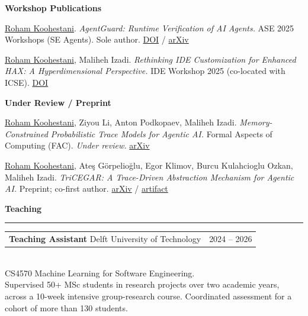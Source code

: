 \documentclass[11pt,letterpaper]{article}
\makeatletter
\newcommand{\cvsection}[1]{%
  \vspace{14pt}%
  {\large\textbf{#1}}\\[-5pt]%
  \rule{\linewidth}{0.4pt}%
  \vspace{4pt}%
}
\newcommand{\cvrow}[2]{%
  \begin{tabular*}{\linewidth}{@{}l@{\extracolsep{\fill}}r@{}}
    #1 & #2
  \end{tabular*}%
}
\newenvironment{publist}[1][0]{%
  \begin{list}{}{%
    \setlength{\leftmargin}{2.4em}%
    \setlength{\itemsep}{6pt}%
    \setlength{\parsep}{0pt}%
    \setlength{\topsep}{4pt}%
  }%
}{\end{list}}
\makeatother
\begin{document}
\vspace{6pt}
\textbf{Workshop Publications}

\begin{publist}
\item[{[W2]}]
  \underline{Roham Koohestani}.
  \textit{AgentGuard: Runtime Verification of AI Agents.}
  ASE 2025 Workshops (SE Agents). Sole author.
  \href{https://doi.org/10.1109/ASEW67777.2025.00023}{DOI} /
  \href{https://arxiv.org/abs/2509.23864}{arXiv}

\item[{[W1]}]
  \underline{Roham Koohestani}, Maliheh Izadi.
  \textit{Rethinking IDE Customization for Enhanced HAX: A Hyperdimensional Perspective.}
  IDE Workshop 2025 (co-located with ICSE).
  \href{https://doi.org/10.1109/IDE66625.2025.00007}{DOI}
\end{publist}

\vspace{6pt}
\textbf{Under Review / Preprint}

\begin{publist}
  \item[{[A2]}]
  \underline{Roham Koohestani}, Ziyou Li, Anton Podkopaev, Maliheh Izadi.
  \textit{Memory-Constrained Probabilistic Trace Models for Agentic AI.}
  Formal Aspects of Computing (FAC). \textit{Under review.}
  \href{https://arxiv.org/abs/2510.23487}{arXiv}

  \item[{[A1]}]
  \underline{Roham Koohestani}, Ate\c{s} G\"{o}rpelio\u{g}lu, Egor Klimov,
  Burcu Kulahcioglu Ozkan, Maliheh Izadi.
  \textit{TriCEGAR: A Trace-Driven Abstraction Mechanism for Agentic AI.}
  Preprint; co-first author.
  \href{https://arxiv.org/abs/2601.22997}{arXiv} /
  \href{https://zenodo.org/records/18338703}{artifact}
\end{publist}

\cvsection{Teaching}

\cvrow{%
  \textbf{Teaching Assistant} \hspace{4pt} Delft University of Technology%
}{2024 -- 2026}\\[2pt]
\hspace*{12pt}
CS4570 Machine Learning for Software Engineering.\\[2pt]
\hspace*{12pt}
Supervised 50+ MSc students in research projects over two academic years, across
a 10-week intensive group-research course.
Coordinated assessment for a cohort of more than 130 students.
\end{document}
